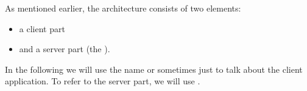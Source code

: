 As mentioned earlier, the \jb{} architecture consists of two elements: 
\begin{itemize}
\item a client part
\item and a server part (the \gdserver).
\end{itemize}
In the following we will use the name \jb{} or sometimes just
 to talk about the client application. 
To refer to the server part, we will 
use \gdserver{}.

